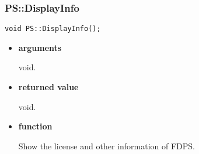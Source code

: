 \subsubsection{PS::DisplayInfo}

\begin{screen}
\begin{verbatim}
void PS::DisplayInfo();
\end{verbatim}
\end{screen}

\begin{itemize}

\item {\bf arguments}

  void.

\item {\bf returned value}

  void.

\item {\bf function}

  Show the license and other information of FDPS.

\end{itemize}
